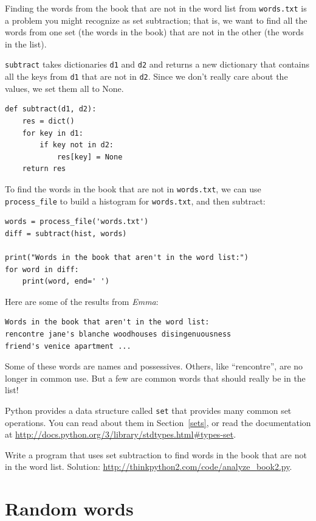 \documentclass[10pt]{book}
\begin{document}
Finding the words from the book that are not in the word list
from {\tt words.txt} is a problem you might recognize as set
subtraction; that is, we want to find all the words from one
set (the words in the book) that are not in the other (the
words in the list).

{\tt subtract} takes dictionaries {\tt d1} and {\tt d2} and returns a
new dictionary that contains all the keys from {\tt d1} that are not
in {\tt d2}.  Since we don't really care about the values, we
set them all to None.

\begin{verbatim}
def subtract(d1, d2):
    res = dict()
    for key in d1:
        if key not in d2:
            res[key] = None
    return res
\end{verbatim}
%
To find the words in the book that are not in {\tt words.txt},
we can use \verb"process_file" to build a histogram for
{\tt words.txt}, and then subtract:

\begin{verbatim}
words = process_file('words.txt')
diff = subtract(hist, words)

print("Words in the book that aren't in the word list:")
for word in diff:
    print(word, end=' ')
\end{verbatim}
%
Here are some of the results from {\em Emma}:

\begin{verbatim}
Words in the book that aren't in the word list:
rencontre jane's blanche woodhouses disingenuousness 
friend's venice apartment ...
\end{verbatim}
%
Some of these words are names and possessives.  Others, like
``rencontre'', are no longer in common use.  But a few are common
words that should really be in the list!

\begin{exercise}

Python provides a data structure called {\tt set} that provides many
common set operations.  You can read about them in Section~\ref{sets},
or read the documentation at
\url{http://docs.python.org/3/library/stdtypes.html#types-set}.

Write a program that uses set subtraction to find words in the book
that are not in the word list.  Solution:
\url{http://thinkpython2.com/code/analyze_book2.py}.

\end{exercise}


\section{Random words}
\label{randomwords}
\end{document}
